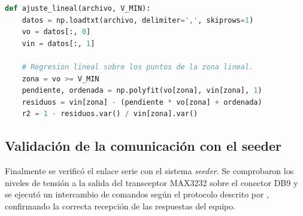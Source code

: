 \begin{lstlisting}[language=Python,basicstyle=\ttfamily\footnotesize,
  columns=fullflexible,breaklines=true,frame=single,rulecolor=\color{black!30},
  caption={Ajuste lineal de ambas mediciones usando Python},label={lst:ajuste-linealidad}]
def ajuste_lineal(archivo, V_MIN):
    datos = np.loadtxt(archivo, delimiter=',', skiprows=1)
    vo = datos[:, 0]
    vin = datos[:, 1]
 
    # Regresion lineal sobre los puntos de la zona lineal.
    zona = vo >= V_MIN
    pendiente, ordenada = np.polyfit(vo[zona], vin[zona], 1)
    residuos = vin[zona] - (pendiente * vo[zona] + ordenada)
    r2 = 1 - residuos.var() / vin[zona].var()
\end{lstlisting}

\subsection{Validación de la comunicación con el seeder}

Finalmente se verificó el enlace serie con el sistema \emph{seeder}. Se comprobaron los niveles de tensión a la salida del transceptor MAX3232 sobre el conector DB9 y se ejecutó un intercambio de comandos según el protocolo descrito por \cite{npphotonics_flm005}, confirmando la correcta recepción de las respuestas del equipo.


